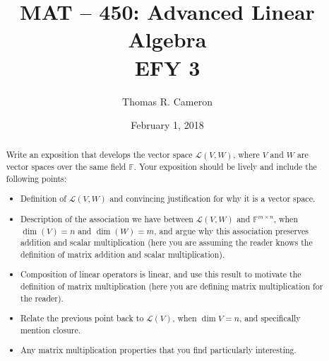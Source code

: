 \documentclass{article}
\title{MAT -- 450: Advanced Linear Algebra\\
\large{EFY 3}}
\author{Thomas R. Cameron}
\date{February 1, 2018}
\begin{document}
\maketitle

\begin{abstract}
Write an exposition that develops the vector space $\mathcal{L}(V,W)$, where $V$ and $W$ are vector spaces over the same field $\mathbb{F}$. Your exposition should be lively and include the following points:
\begin{itemize}
\item	Definition of $\mathcal{L}(V,W)$ and convincing justification for why it is a vector space. 
\item Description of the association we have between $\mathcal{L}(V,W)$ and $\mathbb{F}^{m\times n}$, when $\dim(V)=n$ and $\dim(W)=m$, and argue why this association preserves addition and scalar multiplication (here you are assuming the reader knows the definition of matrix addition and scalar multiplication).
\item	Composition of linear operators is linear, and use this result to motivate the definition of matrix multiplication (here you are defining matrix multiplication for the reader).
\item	Relate the previous point back to $\mathcal{L}(V)$, when $\dim V=n$, and specifically mention closure.
\item	Any matrix multiplication properties that you find particularly interesting. 
\end{itemize}

\end{abstract}
\end{document}
